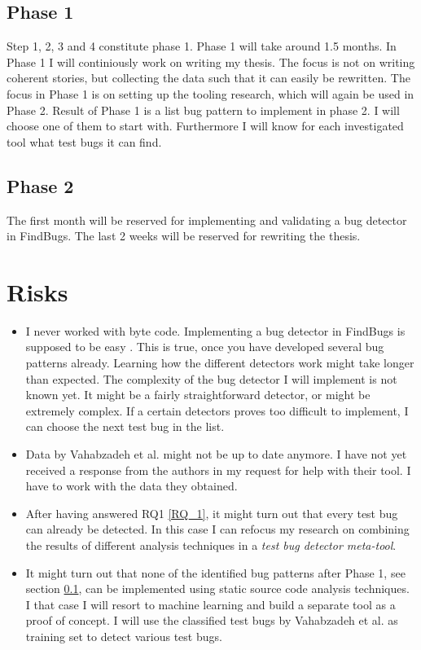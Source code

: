 \documentclass{uvamscse}
\newcommand{\Atestbugs}{Vahabzadeh et al.}
\begin{document}
\subsection{Phase 1}
\label{sec:phase1}
Step 1, 2, 3 and 4 constitute phase 1. Phase 1 will take around 1.5 months. In Phase 1 I will continiously work on writing my thesis. The focus is not on writing coherent stories, but collecting the data such that it can easily be rewritten. The focus in Phase 1 is on setting up the tooling research, which will again be used in Phase 2. Result of Phase 1 is a list bug pattern to implement in phase 2. I will choose one of them to start with. Furthermore I will know for each investigated tool what test bugs it can find.

\subsection{Phase 2}
\label{sec:phase2}
The first month will be reserved for implementing and validating a bug detector in FindBugs. The last 2 weeks will be reserved for rewriting the thesis. 

\section{Risks}
\begin{itemize}
	\item I never worked with byte code. Implementing a bug detector in FindBugs is supposed to be easy \cite{hovemeyer2004finding}. This is true, once you have developed several bug patterns already. Learning how the different detectors work might take longer than expected. The complexity of the bug detector I will implement is not known yet. It might be a fairly straightforward detector, or might be extremely complex. If a certain detectors proves too difficult to implement, I can choose the next test bug in the list.
	\item Data by \Atestbugs{} might not be up to date anymore. I have not yet received a response from the authors in my request for help with their tool. I have to work with the data they obtained.
	\item After having answered RQ1 \ref{RQ_1}, it might turn out that every test bug can already be detected. In this case I can refocus my research on combining the results of different analysis techniques in a \textit{test bug detector meta-tool}.
	\item It might turn out that none of the identified bug patterns after Phase 1, see section \ref{sec:phase1}, can be implemented using static source code analysis techniques. I that case I will resort to machine learning and build a separate tool as a proof of concept. I will use the classified test bugs by \Atestbugs{} as training set to detect various test bugs.
\end{itemize}
\end{document}

